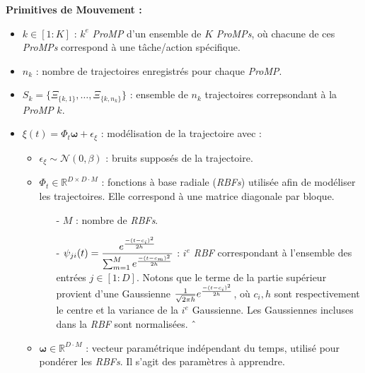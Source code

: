 \documentclass[utf8]{frontiersSCNS} %
\begin{document}
\textbf{Primitives de Mouvement :}
\begin{itemize}
\item $k \in [1:K]$ : $k^{e}$ \textit{ProMP} d'un ensemble de $K$ \textit{ProMPs}, où chacune de ces \textit{ProMPs} correspond à une tâche/action spécifique.
\item $n_k$ : nombre de trajectoires enregistrés pour chaque \textit{ProMP}.
\item $S_k = \{\Xi_{\{k,1\}},\ldots,\Xi_{\{k,n_k\}}\}$ : ensemble de $n_k$ trajectoires correpsondant à la \textit{ProMP} $k$. 
\end{itemize}
\begin{itemize}
\item $\xi(t) = \Phi_t \boldsymbol{\omega} + \epsilon_\xi$ : modélisation de la trajectoire avec :
\begin{itemize}
\item $\epsilon_\xi \sim \mathcal{N}(0, \beta)$ : bruits supposés de la trajectoire.
\item $\Phi_t \in \mathbb{R}^{D\times D \cdot M}$ : fonctions à base radiale (\textit{RBFs}) utilisée afin de modéliser les trajectoires. Elle correspond à une matrice diagonale par bloque.
\begin{itemize}
\item[-] $M$ : nombre de \textit{RBFs}.
\item[-] $ \psi_{ji}(t) =\dfrac{e^{-(t - c_i)^2 \over 2h}}{\sum_{m=1}^{M} e^{-(t - c_m)^2 \over 2h} }$ : $i^e$ \textit{RBF} correspondant à l'ensemble des entrées $j \in [1:D]$. 
Notons que le terme de la partie supérieur provient d'une Gaussienne $\frac{1}{\sqrt{2\pi h}} e^{-(t - c_i)^2 \over 2h}$, où $ c_i, h$ sont respectivement le centre et la variance de la $i^e$ Gaussienne. Les Gaussiennes incluses dans la \textit{RBF} sont normalisées.
ˆ%
\end{itemize}
\item $\boldsymbol{\omega} \in \mathbb{R}^{D \cdot M}$ : vecteur paramétrique indépendant du temps, utilisé pour pondérer les \textit{RBFs}. Il s'agit des paramètres à apprendre.

\end{itemize}


\end{itemize}
\end{document}
